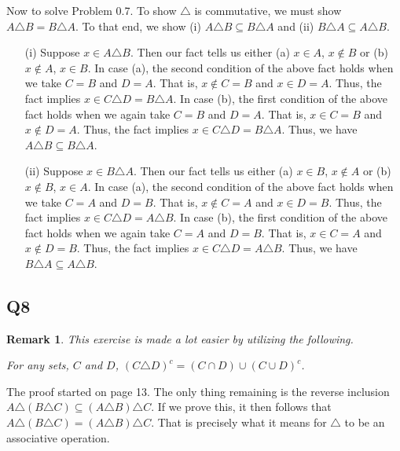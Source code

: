 \documentclass[12pt]{article}
\newtheorem{remark}{Remark}
\numberwithin{theorem}{section}
\numberwithin{equation}{section}
\numberwithin{remark}{section}
\numberwithin{definition}{section}
\numberwithin{theorem}{section}
\numberwithin{lemma}{section}
\numberwithin{example}{section}
\begin{document}
Now to solve Problem 0.7. To show $\triangle$ is commutative, we must show $A \triangle B = B \triangle A$. To that end, we show (i) $A \triangle B \subseteq B \triangle A$ and (ii) $B \triangle A \subseteq A \triangle B$.
\begin{itemize}
	\item[(i)]{Suppose $x\in A\triangle B$. Then our fact tells us either (a) $x\in A$, $x\notin B$ or (b) $x\notin A$, $x \in B$. In case (a), the second condition of the above fact holds when we take $C = B$ and $D = A$. That is, $x \notin C = B$ and $x \in D = A$. Thus, the fact implies $x \in C \triangle  D = B \triangle A$. In case (b), the first condition of the above fact holds when we again take $C = B$ and $D = A$. That is, $x \in C = B$ and $x \notin D = A$. Thus, the fact implies $x \in C \triangle D = B \triangle A$. Thus, we have $A \triangle B \subseteq B \triangle A$.}
	\item[(ii)]{Suppose $x\in B\triangle A$. Then our fact tells us either (a) $x\in B$, $x\notin A$ or (b) $x\notin B$, $x \in A$. In case (a), the second condition of the above fact holds when we take $C = A$ and $D = B$. That is, $x \notin C = A$ and $x \in D = B$. Thus, the fact implies $x \in C \triangle  D = A \triangle B$. In case (b), the first condition of the above fact holds when we again take $C = A$ and $D = B$. That is, $x \in C = A$ and $x \notin D = B$. Thus, the fact implies $x \in C \triangle D = A \triangle B$. Thus, we have $B \triangle A \subseteq A \triangle B$.}
\end{itemize}

\subsection{Q8}

\begin{remark}
	This exercise is made a lot easier by utilizing the following.
	\begin{center}
		For any sets, $C$ and $D$, $(C \triangle D)^c = (C \cap D) \cup (C \cup D)^c$.
	\end{center}
\end{remark}

The proof started on page 13. The only thing remaining is the reverse inclusion $A \triangle (B \triangle C) \subseteq (A \triangle B) \triangle C$. If we prove this, it then follows that $A \triangle (B \triangle C) = (A \triangle B) \triangle C$. That is precisely what it means for $\triangle$ to be an associative operation.
\end{document}
